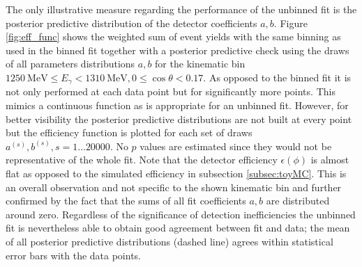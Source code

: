 The only illustrative measure regarding the performance of the unbinned fit is the posterior predictive distribution of the detector coefficients $a,b$. Figure \ref{fig:eff_func} shows the weighted sum of event yields with the same binning as used in the binned fit together with a posterior predictive check using the draws of all parameters distributions $a,b$ for the kinematic bin $\SI{1250}{\mega\eV}\leq E_\gamma<\SI{1310}{\mega\eV}, 0\leq\cos\theta<0.17$. 
As opposed to the binned fit it is not only performed at each data point but for significantly more points. This mimics a continuous function as is appropriate for an unbinned fit. However, for better visibility the posterior predictive distributions are not built at every point but the efficiency function is plotted for each set of draws $a^{(s)},b^{(s)}, s=1\dots20000$. No $p$ values are estimated since they would not be representative of the whole fit. Note that the detector efficiency $\epsilon\left(\phi\right)$ is almost flat as opposed to the simulated efficiency in subsection \ref{subsec:toyMC}. This is an overall observation and not specific to the shown kinematic bin and further confirmed by the fact that the sums of all fit coefficients $a,b$ are distributed around zero. Regardless of the significance of detection inefficiencies the unbinned fit is nevertheless able to obtain good agreement between fit and data; the mean of all posterior predictive distributions (dashed line) agrees within statistical error bars with the data points.
